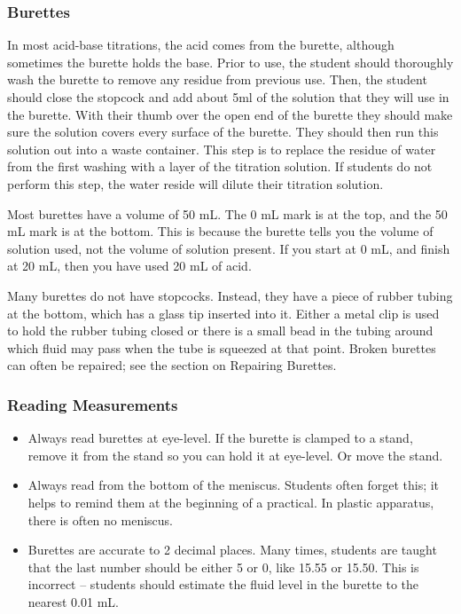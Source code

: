 \subsubsection{Burettes}

In most acid-base titrations, the acid comes from the burette, although sometimes the burette holds the base. Prior to use, the student should thoroughly wash the burette to remove any residue from previous use. Then, the student should close the stopcock and add about 5ml of the solution that they will use in the burette. With their thumb over the open end of the burette they should make sure the solution covers every surface of the burette. They should then run this solution out into a waste container. This step is to replace the residue of water from the first washing with a layer of the titration solution. If students do not perform this step, the water reside will dilute their titration solution.

Most burettes have a volume of 50 mL. The 0 mL mark is at the top, and the 50 mL mark is at the bottom. This is because the burette tells you the volume of solution used, not the volume of solution present. If you start at 0 mL, and finish at 20 mL, then you have used 20 mL of acid.

Many burettes do not have stopcocks. Instead, they have a piece of rubber tubing at the bottom, which has a glass tip inserted into it. Either a metal clip is used to hold the rubber tubing closed or there is a small bead in the tubing around which fluid may pass when the tube is squeezed at that point. Broken burettes can often be repaired; see the section on Repairing Burettes.

\subsubsection{Reading Measurements}

\begin{itemize}

\item{Always read burettes at eye-level. If the burette is clamped to a stand, remove it from the stand so you can hold it at eye-level. Or move the stand.}

\item{Always read from the bottom of the meniscus. Students often forget this; it helps to remind them at the beginning of a practical. In plastic apparatus, there is often no meniscus.}

\item{Burettes are accurate to 2 decimal places. Many times, students are taught that the last number should be either 5 or 0, like 15.55 or 15.50. This is incorrect – students should estimate the fluid level in the burette to the nearest 0.01 mL.}

\end{itemize}

